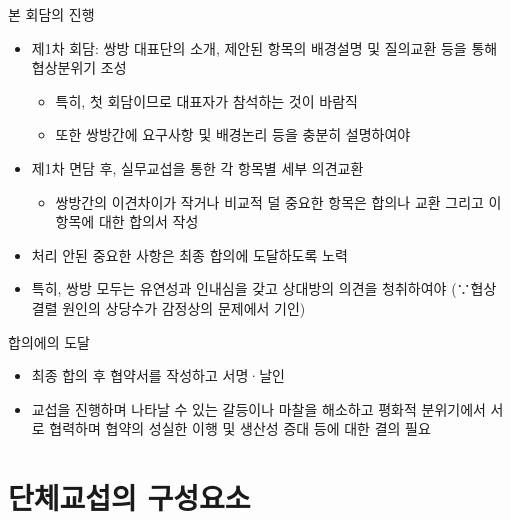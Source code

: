 \documentclass[aspectratio=169,xcolor=dvipsnames,handout]{beamer}
\begin{document}
\begin{frame}{본 회담의 진행}
    \begin{itemize}[<+->]
        \item 제1차 회담: 쌍방 대표단의 소개, 제안된 항목의 배경설명 및 질의교환 등을 통해 협상분위기 조성
        \begin{itemize}[<+->]
            \item 특히, 첫 회담이므로 대표자가 참석하는 것이 바람직
            \item 또한 쌍방간에 요구사항 및 배경논리 등을 충분히 설명하여야
        \end{itemize}
        \item 제1차 면담 후, 실무교섭을 통한 각 항목별 세부 의견교환
        \begin{itemize}[<+->]
            \item 쌍방간의 이견차이가 작거나 비교적 덜 중요한 항목은 합의나 교환 그리고 이 항목에 대한 합의서 작성
        \end{itemize}
    \item 처리 안된 중요한 사항은 최종 합의에 도달하도록 노력
    \item 특히, 쌍방 모두는 유연성과 인내심을 갖고 상대방의 의견을 청취하여야 (∵협상 결렬 원인의 상당수가 감정상의 문제에서 기인)
    \end{itemize}
\end{frame}

\begin{frame}{합의에의 도달}
    \begin{itemize}[<+->]
        \item 최종 합의 후 협약서를 작성하고 서명·날인
        \item 교섭을 진행하며 나타날 수 있는 갈등이나 마찰을 해소하고  평화적 분위기에서 서로 협력하며 협약의 성실한 이행 및 생산성 증대 등에 대한 결의 필요
    \end{itemize}
\end{frame}

\section{단체교섭의 구성요소}
\end{document}
